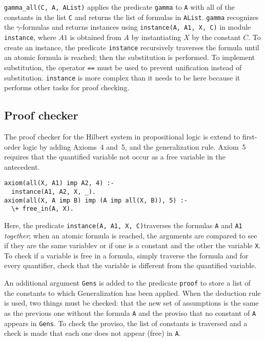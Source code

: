 \documentclass[11pt]{article}
\newcommand*{\p}[1]{\textup{\texttt{#1}}}
\begin{document}
\p{gamma\_all(C, A, AList)} applies the predicate \p{gamma} to \p{A}
with all of the constants in the list \p{C} and returns the list of
formulas in \p{AList}. \p{gamma} recognizes the $\gamma$-formulas and
returns instances using \p{instance(A, A1, X, C)} in module
\p{instance}, where $A1$ is obtained from $A$ by instantiating $X$ by
the constant $C$. To create an instance, the predicate \p{instance}
recursively traverses the formula until an atomic formula is reached;
then the substitution is performed. To implement substitution, the
operator \p{==} must be used to prevent unification instead of
substitution. \p{instance} is more complex than it needs to be here
because it performs other tasks for proof checking.



\subsection{Proof checker}\label{s.checkfol}

The proof checker for the Hilbert system in propositional logic is
extend to first-order logic by adding Axioms~4 and~5, and the
generalization rule. Axiom~5 requires that the quantified variable not
occur as a free variable in the antecedent.

\begin{verbatim}
axiom(all(X, A1) imp A2, 4) :-
  instance(A1, A2, X, _).
axiom(all(X, A imp B) imp (A imp all(X, B)), 5) :-
  \+ free_in(A, X).
\end{verbatim}

Here, the predicate \p{instance(A, A1, X, C)}traverses the formulas
\p{A} and \p{A1} \emph{together}; when an atomic formula is reached, the
arguments are compared to see if they are the same variablev or if one
is a constant and the other the variable \p{X}. To check if a variable
is free in a formula, simply traverse the formula and for every
quantifier, check that the variable is different from the quantified
variable.

An additional argument \p{Gens} is added to the predicate \p{proof} to
store a list of the constants to which Generalization has been applied.
When the deduction rule is used, two things must be checked: that the
new set of assumptions is the same as the previous one without the
formula \p{A} and the proviso that no constant of \p{A} appears in
\p{Gens}. To check the proviso, the list of constants is traversed and a
check is made that each one does not appear (free) in \p{A}.
\end{document}
